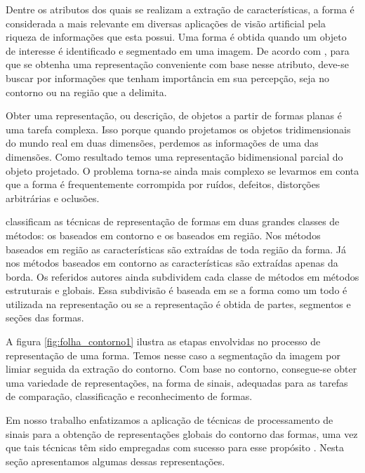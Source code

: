 Dentre os atributos dos quais se realizam a extração de características, a forma é considerada a mais relevante em diversas aplicações de visão artificial pela riqueza de informações que esta possui. Uma forma é obtida quando um objeto de interesse é identificado e segmentado em uma imagem. 
 De acordo com , para que se obtenha uma representação conveniente com base nesse atributo, deve-se buscar por informações que tenham importância em sua percepção, seja no contorno ou na região que a delimita. 

Obter uma representação, ou descrição, de objetos a partir de formas planas é uma tarefa complexa. Isso porque quando projetamos os objetos tridimensionais do mundo real em duas dimensões, perdemos as informações de uma das dimensões. Como resultado temos uma representação bidimensional parcial do objeto projetado. O problema torna-se ainda mais complexo se levarmos em conta que a forma é frequentemente corrompida por ruídos, defeitos, distorções arbitrárias e oclusões.

 classificam as técnicas de representação de formas em duas grandes classes de métodos: os baseados em contorno e os baseados em região. Nos métodos baseados em região as características são extraídas de toda região da forma. Já nos métodos baseados em contorno as características são extraídas apenas da borda. Os referidos autores ainda subdividem cada classe de métodos em métodos estruturais e globais. Essa subdivisão é baseada em se a forma como um todo é utilizada na representação ou se a representação é obtida de partes, segmentos e seções das formas. 

A figura \ref{fig:folha_contorno1} ilustra as etapas envolvidas no processo de representação de uma forma. Temos nesse caso a segmentação da imagem por limiar seguida da extração do contorno. Com base no contorno, consegue-se obter uma variedade de representações, na forma de sinais, adequadas para as tarefas de comparação, classificação e reconhecimento de formas.

Em nosso trabalho  enfatizamos a aplicação de técnicas de processamento de sinais para a obtenção de representações globais do contorno das formas, uma vez que tais técnicas têm sido empregadas com sucesso para esse propósito \cite{Costa:2009}. Nesta seção apresentamos algumas dessas representações. 

\begin{comment}
Técnicas baseadas em contorno de formas exploram apenas a região da borda da forma. Há dois tipos de abordagens para extração de características do contorno das formas: global e estrutural. Na abordagem global a forma não é dividida em sub-partes e um vetor de características que representa toda a borda é obtido para representar a forma. Na abordagem estrutural a borda da forma é particionada em segmentos, denominados de primitivas mediante algum critério. A representação final é geralmente uma cadeia de caracteres, um grafo ou uma árvore.
\end{comment}



